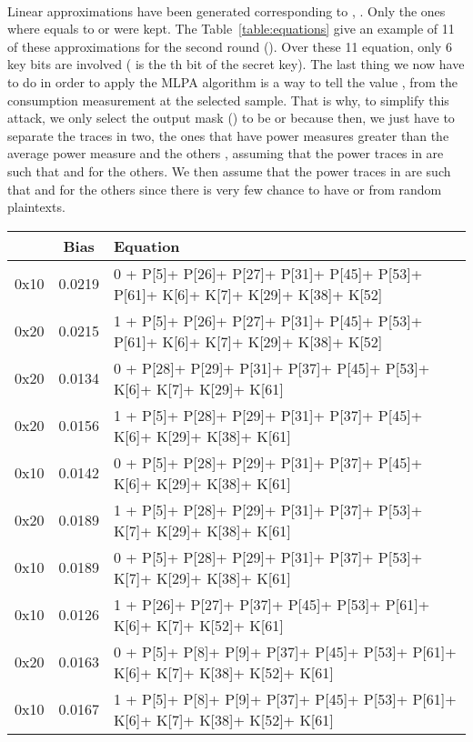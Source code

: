 \documentclass[11pt,a4paper]{article}
\begin{document}
{{{{{{{{{{{\paragraph{}
Linear approximations have been generated corresponding to , . Only the ones where  equals to  or  were kept. The Table~\ref{table:equations}
give an example of 11 of these approximations for the second round (). Over these 11 equation, only 6 key bits are involved ( is the th bit of the secret key). The last thing we 
now have to do in order to apply the MLPA algorithm is a way to tell the value ,  from the consumption measurement at the selected sample. That is why, to
simplify this attack, we only select the output mask () to be  or  because then, we just have to separate the traces in two, the ones that have power measures greater
than the average power measure  and the others , assuming that the power traces in  are such that  and  for the others. We then 
assume that the power traces in  are such that  and  for the others since there is very few chance to have  or 
from random plaintexts.
\begin{table}[!h]
\tiny{
\begin{center}
\begin{tabular}{|c|c|l|}
\hline
 & Bias & Equation \\
\hline
\hline
0x10 & 0.0219 & 0 + P[5]+ P[26]+ P[27]+ P[31]+ P[45]+ P[53]+ P[61]+ K[6]+ K[7]+ K[29]+ K[38]+ K[52] \\
0x20 & 0.0215 & 1 + P[5]+ P[26]+ P[27]+ P[31]+ P[45]+ P[53]+ P[61]+ K[6]+ K[7]+ K[29]+ K[38]+ K[52] \\
0x20 & 0.0134 & 0 + P[28]+ P[29]+ P[31]+ P[37]+ P[45]+ P[53]+ K[6]+ K[7]+ K[29]+ K[61] \\
0x20 & 0.0156 & 1 + P[5]+ P[28]+ P[29]+ P[31]+ P[37]+ P[45]+ K[6]+ K[29]+ K[38]+ K[61] \\
0x10 & 0.0142 & 0 + P[5]+ P[28]+ P[29]+ P[31]+ P[37]+ P[45]+ K[6]+ K[29]+ K[38]+ K[61] \\
0x20 & 0.0189 & 1 + P[5]+ P[28]+ P[29]+ P[31]+ P[37]+ P[53]+ K[7]+ K[29]+ K[38]+ K[61] \\
0x10 & 0.0189 & 0 + P[5]+ P[28]+ P[29]+ P[31]+ P[37]+ P[53]+ K[7]+ K[29]+ K[38]+ K[61] \\
0x10 & 0.0126 & 1 + P[26]+ P[27]+ P[37]+ P[45]+ P[53]+ P[61]+ K[6]+ K[7]+ K[52]+ K[61] \\
0x20 & 0.0163 & 0 + P[5]+ P[8]+ P[9]+ P[37]+ P[45]+ P[53]+ P[61]+ K[6]+ K[7]+ K[38]+ K[52]+ K[61] \\
0x10 & 0.0167 & 1 + P[5]+ P[8]+ P[9]+ P[37]+ P[45]+ P[53]+ P[61]+ K[6]+ K[7]+ K[38]+ K[52]+ K[61] \\

\end{tabular}
\end{center}}
\end{table}}}}}}}}}}}}
\end{document}
